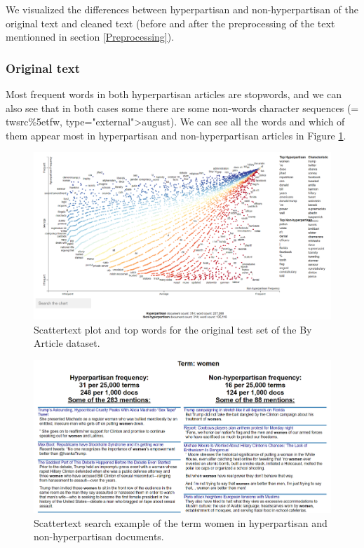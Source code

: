 \documentclass[11pt,a4paper]{article}
\begin{document}
We visualized the differences between hyperpartisan and non-hyperpartisan of the original text and cleaned text (before and after the preprocessing of the text mentionned in section \ref{Preprocessing}).

\subsubsection{Original text}

Most frequent words in both hyperpartisan articles are stopwords, and we can also see that in both cases some there are some non-words character sequences (= twsrc\%5etfw, type="external">august). We can see all the words and which of them appear most in hyperpartisan and non-hyperpartisan articles in Figure \ref{fig:byarticle_test}. 

\begin{figure}[ht]
    \centering
    \includegraphics[width=\linewidth]{byarticle_test.png}
    \caption{Scattertext plot and top words for the original test set of the By Article dataset.}
    \label{fig:byarticle_test}
\end{figure}

\begin{figure}[ht]
    \centering
    \includegraphics[width=\linewidth]{byarticle_test_search.png}
    \caption{Scattertext search example of the term women in hyperpartisan and non-hyperpartisan documents.}
    \label{fig:byarticle_test_search}
\end{figure}
\end{document}
